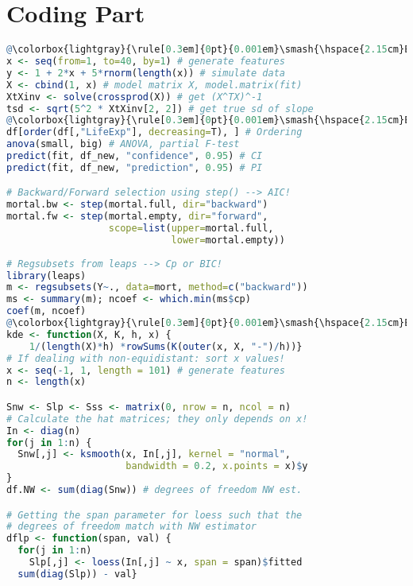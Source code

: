 \section{Coding Part}
\lstset{frame=single, basicstyle=\ttfamily, aboveskip=0pt, escapechar=@, belowskip=0pt}
\begin{lstlisting}[language=R]
@\colorbox{lightgray}{\rule[0.3em]{0pt}{0.001em}\smash{\hspace{2.15cm}Exercise 1\hspace{2.15cm}}}@
x <- seq(from=1, to=40, by=1) # generate features
y <- 1 + 2*x + 5*rnorm(length(x)) # simulate data
X <- cbind(1, x) # model matrix X, model.matrix(fit)
XtXinv <- solve(crossprod(X)) # get (X^TX)^-1
tsd <- sqrt(5^2 * XtXinv[2, 2]) # get true sd of slope
@\colorbox{lightgray}{\rule[0.3em]{0pt}{0.001em}\smash{\hspace{2.15cm}Exercise 2\hspace{2.15cm}}}@
df[order(df[,"LifeExp"], decreasing=T), ] # Ordering 
anova(small, big) # ANOVA, partial F-test
predict(fit, df_new, "confidence", 0.95) # CI
predict(fit, df_new, "prediction", 0.95) # PI

# Backward/Forward selection using step() --> AIC!
mortal.bw <- step(mortal.full, dir="backward")
mortal.fw <- step(mortal.empty, dir="forward", 
                  scope=list(upper=mortal.full, 
                             lower=mortal.empty))
                             
# Regsubsets from leaps --> Cp or BIC!
library(leaps)
m <- regsubsets(Y~., data=mort, method=c("backward"))
ms <- summary(m); ncoef <- which.min(ms$cp)
coef(m, ncoef)
@\colorbox{lightgray}{\rule[0.3em]{0pt}{0.001em}\smash{\hspace{2.15cm}Exercise 3\hspace{2.15cm}}}@
kde <- function(X, K, h, x) {
    1/(length(X)*h) *rowSums(K(outer(x, X, "-")/h))}
# If dealing with non-equidistant: sort x values!
x <- seq(-1, 1, length = 101) # generate features
n <- length(x)

Snw <- Slp <- Sss <- matrix(0, nrow = n, ncol = n)
# Calculate the hat matrices; they only depends on x!
In <- diag(n)
for(j in 1:n) {
  Snw[,j] <- ksmooth(x, In[,j], kernel = "normal", 
                     bandwidth = 0.2, x.points = x)$y
}
df.NW <- sum(diag(Snw)) # degrees of freedom NW est. 

# Getting the span parameter for loess such that the
# degrees of freedom match with NW estimator
dflp <- function(span, val) {
  for(j in 1:n)
    Slp[,j] <- loess(In[,j] ~ x, span = span)$fitted
  sum(diag(Slp)) - val}
  

\end{lstlisting}
